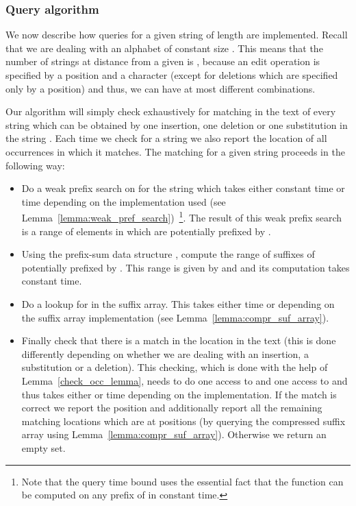 \documentclass{article}
\newcommand{\?}{\mskip1.5mu}
\begin{document}
\subsubsection{Query algorithm}
\label{section:const_query_algo1}
We now describe how queries for a given string  of length  are implemented. Recall that we are dealing with an alphabet of constant size . This means that the number of strings at distance  from a given  is , because an edit operation is specified by a position and a character (except for deletions which are specified only by a position) and thus, we can have at most  different combinations. 

Our algorithm will simply check exhaustively for matching in the text of every string  which can be obtained by one insertion, one deletion or one substitution in the string . 
Each time we check for a string  we also report the location of all occurrences in which it matches. The matching for a given string  proceeds in the following way:
\begin{itemize}
\item Do a weak prefix search on  for the string  which takes either constant time or  time depending on the implementation used (see Lemma~\ref{lemma:weak_pref_search})~\footnote{Note that the query time bound uses the essential fact that the function  can be computed on any prefix  of  in constant time.}. The result of this weak prefix search is a range  of elements in  which are potentially prefixed by . 

\item Using the prefix-sum data structure , compute the range  of suffixes of  potentially prefixed by . This range is given by  and  and its computation takes constant time. 
\item Do a lookup for  in the suffix array. This takes either time  or  depending on the suffix array implementation (see Lemma~\ref{lemma:compr_suf_array}). 
\item Finally check that there is a match in the location  in the text (this is done differently depending on whether we are dealing with an insertion, a substitution or a deletion). This checking, which is done with the help of Lemma~\ref{check_occ_lemma}, needs to do one access to  and one access to  and thus takes either  or  time depending on the implementation. If the match is correct we report the position  and additionally report all the remaining matching locations which are at positions  (by querying the compressed suffix array using Lemma~\ref{lemma:compr_suf_array}). Otherwise we return an empty set. 
\end{itemize}
\end{document}

